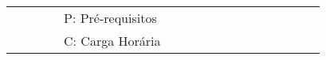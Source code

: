 \begin{landscape}
\begin{table}[h!]
\begin{tabular}{lcllcllcllcllcllcl}
\multicolumn{1}{l|}{}     & \multicolumn{1}{c|}{}                                                                                                   &                              &                         & \multicolumn{2}{l}{P: Pré-requisitos}                                                                                                                      &                         & \multicolumn{1}{l}{}                                                                                                    &                               &                         & \multicolumn{1}{l}{}                                                                                             &                               &                         & \multicolumn{1}{l}{}                                                                                                               &                               & \multicolumn{1}{l|}{}   & \multicolumn{1}{c|}{}                                                                                                        &                               \\
\multicolumn{1}{l|}{}     & \multicolumn{1}{c|}{}                                                                                                   &                              &                         & \multicolumn{2}{l}{C: Carga Horária}                                                                                                                       &                         & \multicolumn{1}{l}{}                                                                                                    &                               &                         & \multicolumn{1}{l}{}                                                                                             &                               &                         & \multicolumn{1}{l}{}                                                                                                               &                               & \multicolumn{1}{l|}{}   & \multicolumn{1}{c|}{}                                                                                                        &                               \\ \cline{1-1} \cline{3-3} \cline{16-16} \cline{18-18} 

\end{tabular}
\end{table}
\end{landscape}
